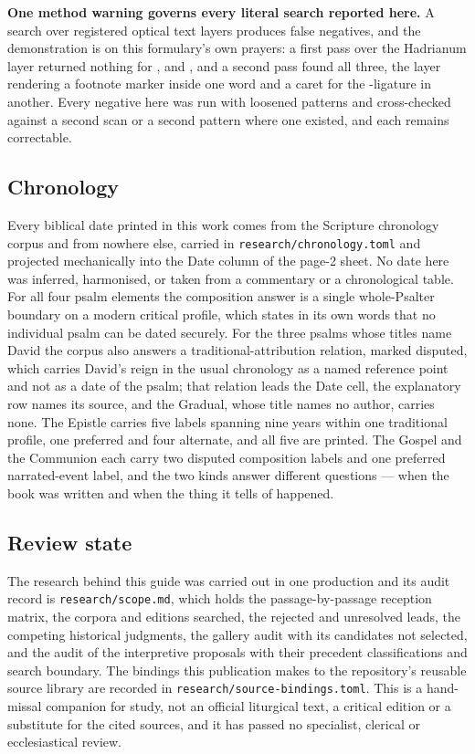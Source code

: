 \textbf{One method warning governs every literal search reported here.} A search
over registered optical text layers produces false negatives, and the
demonstration is on this formulary's own prayers: a first pass over the Hadrianum
layer returned nothing for ,  and , and a second pass found all three,
the layer rendering a footnote marker inside one word and a caret for the
-ligature in another. Every negative here was run with loosened patterns
and cross-checked against a second scan or a second pattern where one existed, and
each remains correctable.

\subsection*{Chronology}

Every biblical date printed in this work comes from the Scripture chronology
corpus and from nowhere else, carried in \texttt{research/chronology.toml} and
projected mechanically into the Date column of the page-2 sheet. No date here was
inferred, harmonised, or taken from a commentary or a chronological table. For all
four psalm elements the composition answer is a single whole-Psalter boundary on
a modern critical profile, which states in its own words that no individual
psalm can be dated securely. For the three psalms whose titles name David the
corpus also answers a traditional-attribution relation, marked disputed, which
carries David's reign in the usual chronology as a named reference point and not
as a date of the psalm; that relation leads the Date cell, the explanatory row
names its source, and the Gradual, whose title names no author, carries none.
The Epistle
carries five labels spanning nine years within one traditional profile, one
preferred and four alternate, and all five are printed. The Gospel and the
Communion each carry two disputed composition labels and one preferred
narrated-event label, and the two kinds answer different questions --- when the
book was written and when the thing it tells of happened.

\subsection*{Review state}

The research behind this guide was carried out in one production and its audit
record is \texttt{research/scope.md}, which holds the passage-by-passage reception
matrix, the corpora and editions searched, the rejected and unresolved leads, the
competing historical judgments, the gallery audit with its candidates not
selected, and the audit of the interpretive proposals with their precedent
classifications and search boundary. The bindings this publication makes to the
repository's reusable source library are recorded in
\texttt{research/source-bindings.toml}. This is a hand-missal companion for study,
not an official liturgical text, a critical edition or a substitute for the cited
sources, and it has passed no specialist, clerical or ecclesiastical review.
